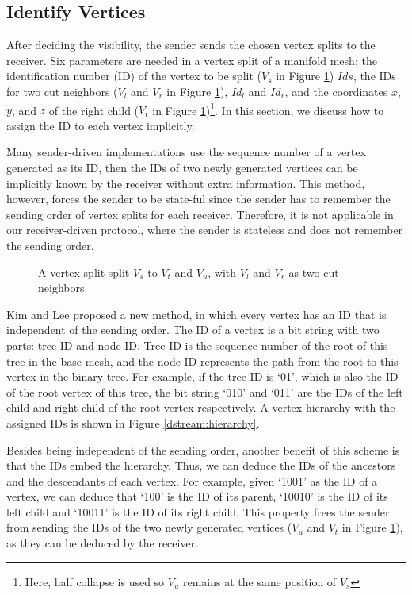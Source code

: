     \subsection{Identify Vertices}
    After deciding the visibility, the sender sends the chosen vertex splits to the receiver.
    Six parameters are needed in a vertex split of a manifold mesh: the identification number
    (ID) of the vertex to be split
    ($V_s$ in Figure \ref{dstream:split}) $Ids$, 
    the IDs for two cut neighbors 
    ($V_l$ and $V_r$ in Figure \ref{dstream:split}), $Id_l$ and $Id_r$,
    and the coordinates $x$, $y$, and $z$ of the right child ($V_t$ in
    Figure \ref{dstream:split})\footnote{Here, half collapse is used so $V_u$ remains at the same position
    of $V_s$}. In this section, we discuss how to assign the ID to each vertex implicitly.
    
    Many sender-driven implementations use the sequence number of a vertex generated as its ID,
    then the IDs of two newly generated vertices can be implicitly known by the receiver without
    extra information. This method, however, 
    forces the sender to be state-ful since the sender has to remember 
    the sending order of vertex splits for each receiver. 
    Therefore, it is not applicable in our receiver-driven protocol, where the sender is stateless and 
    does not remember the sending order. 
    \begin{figure}
    \centering
    \caption{A vertex split split $V_s$ to $V_t$ and $V_u$, with $V_l$ and $V_r$ as two cut neighbors.}
    \label{dstream:split}
    \end{figure}

    Kim and Lee \cite{kim01truly} proposed a new method, in which every vertex has
    an ID that is independent of the sending order. The ID of a vertex is a bit string
    with two parts: tree ID and node ID.
    Tree ID is the sequence number of the root of this tree in the base mesh, 
    and the node ID represents the path from the root to this vertex in the binary tree.
    For example, if the tree ID is `01', which is also the ID of
    the root vertex of this tree, the bit string `010' and `011' are the IDs
    of the left child and right child of the root vertex respectively. 
    A vertex hierarchy with the assigned IDs is shown in 
    Figure \ref{dstream:hierarchy}.

    Besides being independent of the sending order, another benefit of this scheme
    is that the IDs embed the hierarchy. Thus,  
    we can deduce the IDs of the ancestors and the descendants of each vertex. 
    For example, given `1001' as the ID of a vertex,
    we can deduce that `100' is the ID of its parent, `10010' is the ID of its left child and 
    `10011' is the ID of its right child. 
    This property frees the sender from sending the IDs of the two newly generated vertices
    ($V_u$ and $V_t$ in Figure \ref{dstream:split}), as they can be deduced by the receiver.

